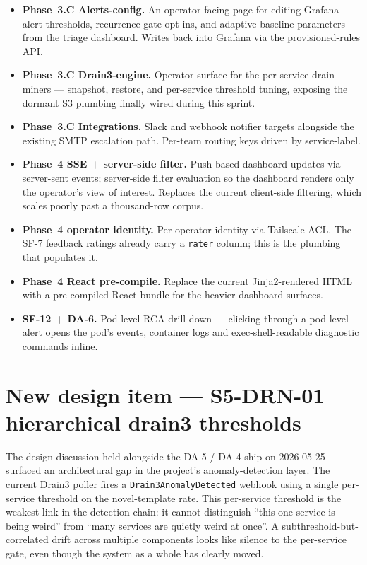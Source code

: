 \documentclass[11pt,a4paper,oneside]{report}
\begin{document}
\begin{itemize}
  \item \textbf{Phase~3.C Alerts-config.}  An operator-facing
        page for editing Grafana alert thresholds, recurrence-gate
        opt-ins, and adaptive-baseline parameters from the
        triage dashboard.  Writes back into Grafana via the
        provisioned-rules API.
  \item \textbf{Phase~3.C Drain3-engine.}  Operator surface for
        the per-service drain miners --- snapshot, restore, and
        per-service threshold tuning, exposing the dormant S3
        plumbing finally wired during this sprint.
  \item \textbf{Phase~3.C Integrations.}  Slack and webhook
        notifier targets alongside the existing SMTP escalation
        path.  Per-team routing keys driven by service-label.
  \item \textbf{Phase~4 SSE + server-side filter.}  Push-based
        dashboard updates via server-sent events; server-side
        filter evaluation so the dashboard renders only the
        operator's view of interest.  Replaces the current
        client-side filtering, which scales poorly past a
        thousand-row corpus.
  \item \textbf{Phase~4 operator identity.}  Per-operator
        identity via Tailscale ACL.  The SF-7 feedback ratings
        already carry a \texttt{rater} column; this is the
        plumbing that populates it.
  \item \textbf{Phase~4 React pre-compile.}  Replace the
        current Jinja2-rendered HTML with a pre-compiled React
        bundle for the heavier dashboard surfaces.
  \item \textbf{SF-12 + DA-6.}  Pod-level RCA drill-down ---
        clicking through a pod-level alert opens the pod's
        events, container logs and exec-shell-readable diagnostic
        commands inline.
\end{itemize}

\section{New design item --- S5-DRN-01 hierarchical drain3 thresholds}
\label{sec:drn-01}

The design discussion held alongside the DA-5 / DA-4 ship on
2026-05-25 surfaced an architectural gap in the project's
anomaly-detection layer.  The current Drain3 poller fires a
\texttt{Drain3AnomalyDetected} webhook using a single per-service
threshold on the novel-template rate.  This per-service threshold
is the weakest link in the detection chain: it cannot
distinguish ``this one service is being weird'' from ``many
services are quietly weird at once''.  A subthreshold-but-correlated
drift across multiple components looks like silence to the
per-service gate, even though the system as a whole has clearly
moved.
\end{document}
